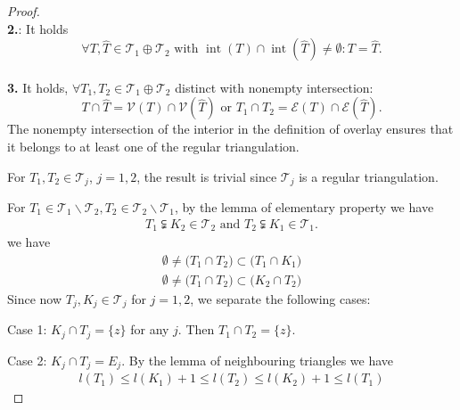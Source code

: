 \documentclass[a4paper,12pt,oneside,fleqn]{book}
\theoremstyle{definition}
\theoremstyle{remark}
\DeclareMathOperator*{\interior}{int}
\begin{document}
\begin{proof}
\quad\\
\textbf{2.}: It holds
\begin{equation}
	\forall T, \hat{T} \in \mathcal{T}_1 \oplus \mathcal{T}_2 \text{ with }\interior(T) \cap \interior(\hat{T}) \neq \emptyset:   T = \hat{T}. 
\end{equation} 
\quad\\
\textbf{3.} It holds, $\forall T_1, T_2 \in \mathcal{T}_1 \oplus \mathcal{T}_2$ distinct with nonempty intersection:
\begin{equation}
	 T \cap \hat{T} = \mathcal{V}(T) \cap \mathcal{V}(\hat{T}) \text{ or } T_1 \cap T_2 = \mathcal{E}(T) \cap \mathcal{E}(\hat{T}).
\end{equation}
The nonempty intersection of the interior in the definition of overlay ensures that it belongs to at least one of the regular triangulation. \par 
For $T_1, T_2 \in \mathcal{T}_j$, $j= 1, 2$, the result is trivial since $\mathcal{T}_j$ is a regular triangulation. \par 
For $T_1 \in \mathcal{T}_1 \backslash \mathcal{T}_2, T_2 \in \mathcal{T}_2 \backslash \mathcal{T}_1$, by the lemma of elementary property we have 
\begin{align*}
	T_1 \subsetneqq K_2 \in \mathcal{T}_2 \text{ and } T_2 \subsetneqq K_1 \in \mathcal{T}_1.
\end{align*}
we have
\begin{align*}
	\emptyset \neq \bigg(T_1 \cap T_2 \bigg) \subset \bigg( T_1 \cap K_1 \bigg)\\
	\emptyset \neq \bigg(T_1 \cap T_2 \bigg) \subset \bigg( K_2 \cap T_2 \bigg)
\end{align*}
Since now $T_j, K_j \in \mathcal{T}_j$ for $ j = 1, 2$, we separate the following cases:\par 
Case 1: $K_j \cap T_j = \{z\}$ for any $j$. Then $T_1 \cap T_2 = \{z\}$. \par 
Case 2: $K_j \cap T_j = E_j$. By the lemma of neighbouring triangles we have
\begin{align*}
	l(T_1)  \le l(K_1) + 1 \le l(T_2) \le l(K_2) + 1 \le l(T_1)
\end{align*}
\end{proof}
\end{document}
